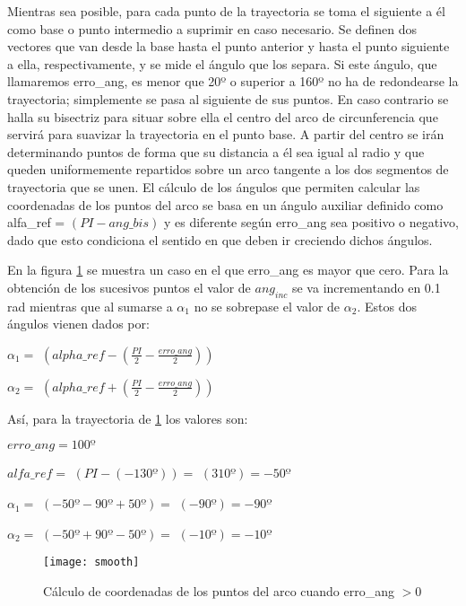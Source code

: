 Mientras sea posible, para cada punto de la trayectoria se toma el siguiente a él como base o punto intermedio a suprimir en caso necesario. Se definen dos vectores que van desde la base hasta el punto anterior y hasta el punto siguiente a ella, respectivamente, y se mide el ángulo que los separa. Si este ángulo, que llamaremos erro\_ang, es menor que 20º o superior a 160º no ha de redondearse la trayectoria; simplemente se pasa al siguiente de sus puntos. En caso contrario se halla su bisectriz para situar sobre ella el centro del arco de circunferencia que servirá para suavizar la trayectoria en el punto base. A partir del centro se irán determinando puntos de forma que su distancia a él sea igual al radio y que queden uniformemente repartidos sobre un arco tangente a los dos segmentos de trayectoria que se unen. El cálculo de los ángulos que permiten calcular las coordenadas de los puntos del arco se basa en un ángulo auxiliar definido como alfa\_ref = $(PI - ang\_bis)$ y es diferente según erro\_ang sea positivo o negativo, dado que esto condiciona el sentido en que deben ir creciendo dichos ángulos.

En la figura \ref{fg:smooth} se muestra un caso en el que erro\_ang es mayor que cero. Para la obtención de los sucesivos puntos el valor de $ang_{inc}$ se va incrementando en 0.1 rad mientras que al sumarse a $\alpha_{1}$ no se sobrepase el valor de $\alpha_{2}$. Estos dos ángulos vienen dados por:

\begin{center}
$\alpha_{1} =$ $(alpha\_ref - (\frac{PI}{2} - \frac{erro\_ang}{2}))$
\end{center}

\begin{center}
$\alpha_{2} =$ $(alpha\_ref + (\frac{PI}{2} - \frac{erro\_ang}{2}))$
\end{center}

Así, para la trayectoria de \ref{fg:smooth} los valores son:
\vspace{0.5cm}

$erro\_ang = 100º$

$alfa\_ref =$ $(PI - (-130º)) =$ $(310º) = -50º$

$\alpha_{1} =$ $(-50º - 90º + 50º) =$ $(-90º) = -90º$

$\alpha_{2} =$ $(-50º + 90º -50º) =$ $(-10º) = -10º$


\begin{figure}[h]
  \centering\texttt{[image: smooth]}\\
  \caption{Cálculo de coordenadas de los puntos del arco cuando erro\_ang $> 0$}\label{fg:smooth}
\end{figure}

